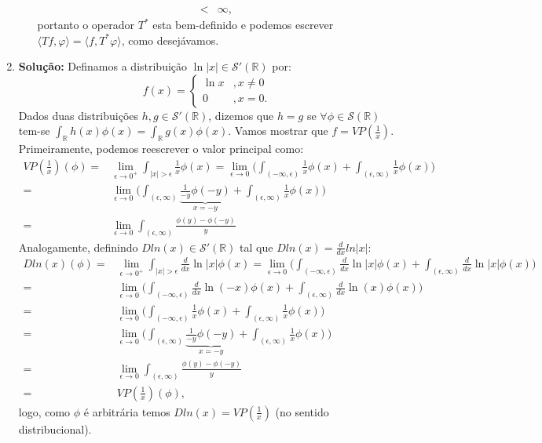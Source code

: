 \documentclass{article}
\begin{document}
\begin{enumerate}
\begin{enumerate}
$$\begin{aligned}
				< & \infty,
				\end{aligned}
				$$
				portanto o operador $T^{*}$ esta bem-definido e podemos escrever $\langle Tf, \varphi \rangle = \langle f, T^{*}\varphi \rangle $, como desejávamos.
			\end{enumerate}		
		\item \textbf{Solução:} Definamos a distribuição $\ln|x| \in \mathcal{S}'(\mathbb{R})$ por:
		$$
		f(x) = 
		\left\{
			\begin{array}{cc}
			\ln x & , x\neq 0 \\
			0 & , x =0.
			\end{array}		
		\right.
		$$
		Dados duas distribuições $h, g \in \mathcal{S}'(\mathbb{R})$, dizemos que $h = g$ se $\forall \phi \in \mathcal{S}(\mathbb{R})$ tem-se $\int_{\mathbb{R}}h(x)\phi(x) = \int_{\mathbb{R}}g(x)\phi(x)$. Vamos mostrar que $f = VP(\frac{1}{x})$. Primeiramente, podemos reescrever o valor principal como:
		$$
		\begin{aligned}
			VP(\frac{1}{x})(\phi) = & \lim_{\epsilon \to 0^{+}} \int_{|x|>\epsilon} \frac{1}{x}\phi(x) = \lim_{\epsilon \to 0} \Big( \int_{(-\infty, \epsilon)} \frac{1}{x}\phi(x) + \int_{(\epsilon, \infty)}  \frac{1}{x}\phi(x) \Big)
			\\
			= & \lim_{\epsilon \to 0} \Big( \int_{(\epsilon, \infty)} \underbrace{ \frac{1}{-y}\phi(-y) }_{x = -y} + \int_{(\epsilon, \infty)} \frac{1}{x}\phi(x) \Big)
			\\
			= & \lim_{\epsilon \to 0} \int_{(\epsilon, \infty)}  \frac{\phi(y)-\phi(-y)}{y}
		\end{aligned}
	 	$$
	 	Analogamente, definindo $Dln(x) \in \mathcal{S}'(\mathbb{R})$ tal que $Dln(x) = \frac{d}{dx}ln|x|$:
		$$
		\begin{aligned}
			Dln(x)(\phi) = & \lim_{\epsilon \to 0^{+}} \int_{|x|>\epsilon} \frac{d}{dx}\ln|x| \phi(x) = \lim_{\epsilon \to 0} \Big( \int_{(-\infty, \epsilon)} \frac{d}{dx}\ln|x| \phi(x) + \int_{(\epsilon, \infty)} \frac{d}{dx}\ln|x| \phi(x) \Big)
			\\
			= & \lim_{\epsilon \to 0} \Big( \int_{(-\infty, \epsilon)} \frac{d}{dx}\ln(-x) \phi(x) + \int_{(\epsilon, \infty)} \frac{d}{dx}\ln (x) \phi(x) \Big)
			\\
			= & \lim_{\epsilon \to 0} \Big( \int_{(-\infty, \epsilon)} \frac{1}{x} \phi(x) + \int_{(\epsilon, \infty)} \frac{1}{x} \phi(x) \Big)
			\\
			= & \lim_{\epsilon \to 0} \Big( \int_{(\epsilon, \infty)} \underbrace{ \frac{1}{-y} \phi(-y) }_{x=-y} + \int_{(\epsilon, \infty)} \frac{1}{x} \phi(x) \Big)
			\\
			= & \lim_{\epsilon \to 0} \int_{(\epsilon, \infty)}  \frac{\phi(y)-\phi(-y)}{y}
			\\
			= & VP(\frac{1}{x})(\phi),
		\end{aligned}
		$$
		logo, como $\phi$ é arbitrária temos $Dln(x) = VP(\frac{1}{x})$ (no sentido distribucional).  
		

\end{enumerate}
\end{document}
